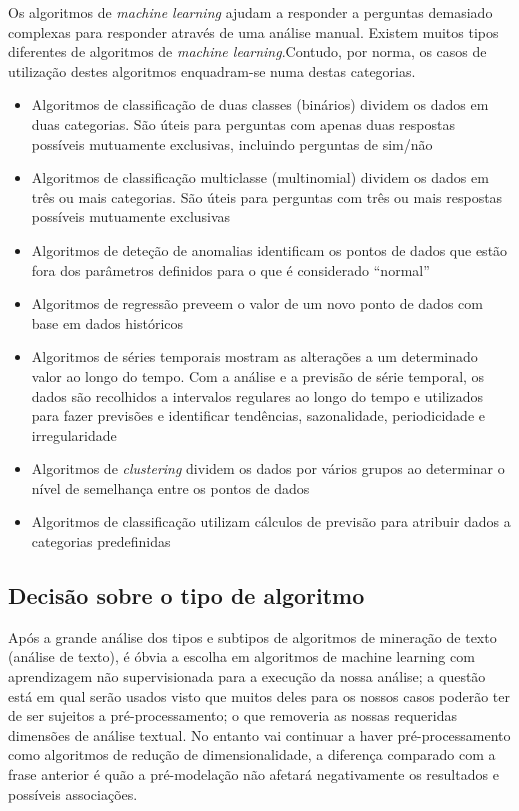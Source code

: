 \documentclass[a4paper,10pt]{article}
\begin{document}
Os algoritmos de \textit{machine learning} ajudam a responder a perguntas demasiado complexas para responder através de uma análise manual.
Existem muitos tipos diferentes de algoritmos de \textit{machine learning}.Contudo, por norma, os casos de utilização destes algoritmos enquadram-se numa destas categorias.
\begin{itemize}
    \item Algoritmos de classificação de duas classes (binários) dividem os dados em duas categorias. São úteis para perguntas com apenas duas respostas possíveis mutuamente exclusivas, incluindo perguntas de sim/não
    \item Algoritmos de classificação multiclasse (multinomial) dividem os dados em três ou mais categorias. São úteis para perguntas com três ou mais respostas possíveis mutuamente exclusivas
    \item Algoritmos de deteção de anomalias identificam os pontos de dados que estão fora dos parâmetros definidos para o que é considerado ``normal''
    \item Algoritmos de regressão preveem o valor de um novo ponto de dados com base em dados históricos
    \item Algoritmos de séries temporais mostram as alterações a um determinado valor ao longo do tempo. Com a análise e a previsão de série temporal, os dados são recolhidos a intervalos regulares ao longo do tempo e utilizados para fazer previsões e identificar tendências, sazonalidade, periodicidade e irregularidade
    \item Algoritmos de \textit{clustering} dividem os dados por vários grupos ao determinar o nível de semelhança entre os pontos de dados
    \item Algoritmos de classificação utilizam cálculos de previsão para atribuir dados a categorias predefinidas
\end{itemize}

\subsection{Decisão sobre o tipo de algoritmo}

Após a grande análise dos tipos e subtipos de algoritmos de mineração de texto (análise de texto), é óbvia a escolha em algoritmos de machine learning com aprendizagem não supervisionada para a execução da nossa análise; a questão está em qual serão usados visto que muitos deles para os nossos casos poderão ter de ser sujeitos a pré-processamento; o que removeria as nossas requeridas dimensões de análise textual. 
No entanto vai continuar a haver pré-processamento como algoritmos de redução de dimensionalidade, a diferença comparado com a frase anterior é quão a pré-modelação não afetará negativamente os resultados e possíveis associações.
\end{document}
